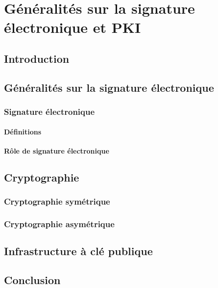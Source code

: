 \chapter{Généralités sur la signature électronique et PKI }
	\section*{Introduction}
	
	\section{Généralités sur la signature électronique}
		\subsection{Signature électronique}
			\subsubsection{Définitions}
			\subsubsection{Rôle de signature électronique}
	\section{Cryptographie}
		\subsection{Cryptographie symétrique}
		\subsection{Cryptographie asymétrique}
	
	\section{Infrastructure à clé publique}
	
			
\section*{Conclusion}
